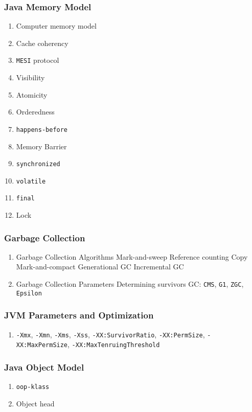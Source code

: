 \documentclass[11pt, twocolumn]{article}
\begin{document}
\subsubsection{Java Memory Model}
\begin{enumerate}
	\item Computer memory model
	\item Cache coherency
	\item \texttt{MESI} protocol
	\item Visibility
	\item Atomicity
	\item Orderedness
	\item \texttt{happens-before}
	\item Memory Barrier
	\item \texttt{synchronized}
	\item \texttt{volatile}
	\item \texttt{final}
	\item Lock
\end{enumerate}

\subsubsection{Garbage Collection}
\begin{enumerate}
	\item Garbage Collection Algorithms
	\subitem Mark-and-sweep
	\subitem Reference counting
	\subitem Copy
	\subitem Mark-and-compact
	\subitem Generational GC
	\subitem Incremental GC
	\item Garbage Collection Parameters
	\subitem Determining survivors
	\subitem GC: \texttt{CMS}, \texttt{G1}, \texttt{ZGC}, \texttt{Epsilon}
\end{enumerate}

\subsubsection{JVM Parameters and Optimization}
\begin{enumerate}
	\item \texttt{-Xmx}, \texttt{-Xmn}, \texttt{-Xms}, \texttt{-Xss}, \texttt{-XX:SurvivorRatio}, \texttt{-XX:PermSize}, \texttt{-XX:MaxPermSize}, \texttt{-XX:MaxTenruingThreshold}
\end{enumerate}

\subsubsection{Java Object Model}
\begin{enumerate}
	\item \texttt{oop-klass}
	\item Object head
\end{enumerate}
\end{document}
